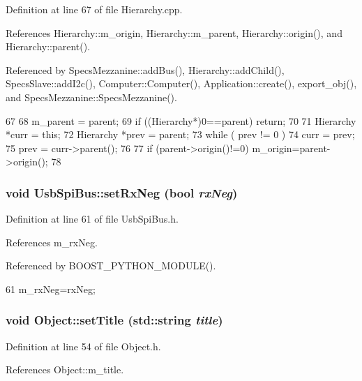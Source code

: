 Definition at line 67 of file Hierarchy.cpp.

References Hierarchy::m\_\-origin, Hierarchy::m\_\-parent, Hierarchy::origin(), and Hierarchy::parent().

Referenced by SpecsMezzanine::addBus(), Hierarchy::addChild(), SpecsSlave::addI2c(), Computer::Computer(), Application::create(), export\_\-obj(), and SpecsMezzanine::SpecsMezzanine().


\begin{DoxyCode}
67                                               {
68   m_parent = parent;
69   if ((Hierarchy*)0==parent) return;
70 
71   Hierarchy *curr = this;
72   Hierarchy *prev = parent;
73   while ( prev != 0 ){
74     curr = prev;
75     prev = curr->parent();
76   }
77   if (parent->origin()!=0) m_origin=parent->origin();
78 }
\end{DoxyCode}
\hypertarget{classUsbSpiBus_aa6c039bb03737e9fd943cbdd2b23388c}{
\subsubsection[{setRxNeg}]{\setlength{\rightskip}{0pt plus 5cm}void UsbSpiBus::setRxNeg (bool {\em rxNeg})}}
\label{classUsbSpiBus_aa6c039bb03737e9fd943cbdd2b23388c}


Definition at line 61 of file UsbSpiBus.h.

References m\_\-rxNeg.

Referenced by BOOST\_\-PYTHON\_\-MODULE().


\begin{DoxyCode}
61 { m_rxNeg=rxNeg; }
\end{DoxyCode}
\hypertarget{classObject_a89557dbbad5bcaa02652f5d7fa35d20f}{
\subsubsection[{setTitle}]{\setlength{\rightskip}{0pt plus 5cm}void Object::setTitle (std::string {\em title})}}
\label{classObject_a89557dbbad5bcaa02652f5d7fa35d20f}


Definition at line 54 of file Object.h.

References Object::m\_\-title.

